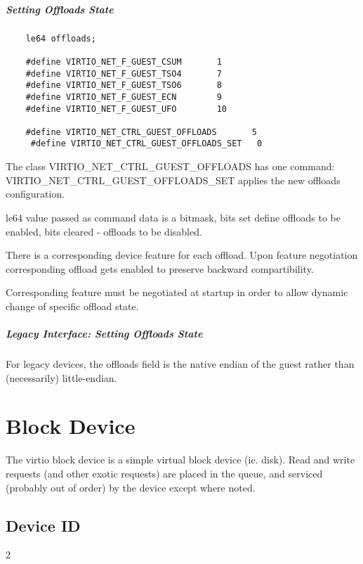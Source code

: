 \subparagraph{Setting Offloads State}\label{sec:Device Types / Network Device / Device Operation / Control Virtqueue / Offloads State Configuration / Setting Offloads State}

\begin{lstlisting}
	le64 offloads;

	#define VIRTIO_NET_F_GUEST_CSUM       1
	#define VIRTIO_NET_F_GUEST_TSO4       7
	#define VIRTIO_NET_F_GUEST_TSO6       8
	#define VIRTIO_NET_F_GUEST_ECN        9
	#define VIRTIO_NET_F_GUEST_UFO        10

	#define VIRTIO_NET_CTRL_GUEST_OFFLOADS       5
	 #define VIRTIO_NET_CTRL_GUEST_OFFLOADS_SET   0
\end{lstlisting}

The class VIRTIO_NET_CTRL_GUEST_OFFLOADS has one command:
VIRTIO_NET_CTRL_GUEST_OFFLOADS_SET applies the new offloads configuration.

le64 value passed as command data is a bitmask, bits set define
offloads to be enabled, bits cleared - offloads to be disabled.

There is a corresponding device feature for each offload. Upon feature
negotiation corresponding offload gets enabled to preserve backward
compartibility.

Corresponding feature must be negotiated at startup in order to allow dynamic
change of specific offload state.


\subparagraph{Legacy Interface: Setting Offloads State}\label{sec:Device Types / Network Device / Device Operation / Control Virtqueue / Offloads State Configuration / Setting Offloads State / Legacy Interface: Setting Offloads State}
For legacy devices, the offloads field is the
native endian of the guest rather than (necessarily) little-endian.


\section{Block Device}\label{sec:Device Types / Block Device}

The virtio block device is a simple virtual block device (ie.
disk). Read and write requests (and other exotic requests) are
placed in the queue, and serviced (probably out of order) by the
device except where noted.

\subsection{Device ID}\label{sec:Device Types / Block Device / Device ID}
  2

